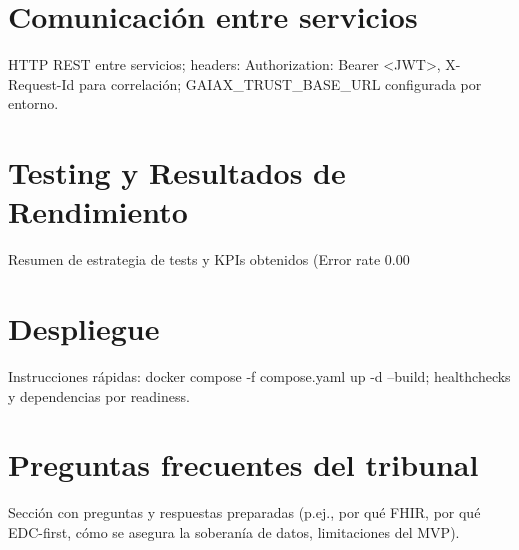 \section{Comunicación entre servicios}
HTTP REST entre servicios; headers: Authorization: Bearer <JWT>, X-Request-Id para correlaci\'on; GAIAX_TRUST_BASE_URL configurada por entorno.

\section{Testing y Resultados de Rendimiento}
Resumen de estrategia de tests y KPIs obtenidos (Error rate 0.00%

\section{Despliegue}
Instrucciones rápidas: docker compose -f compose.yaml up -d --build; healthchecks y dependencias por readiness.

\section{Preguntas frecuentes del tribunal}
Sección con preguntas y respuestas preparadas (p.ej., por qué FHIR, por qué EDC-first, cómo se asegura la soberanía de datos, limitaciones del MVP).

